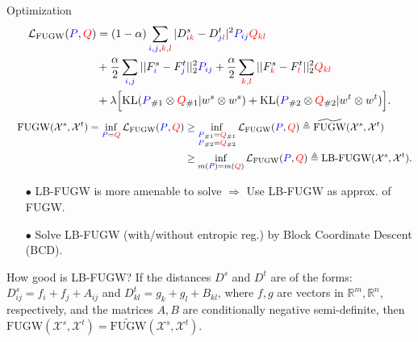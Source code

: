 \documentclass{beamer}
\newcommand{\fugw}{\text{FUGW}}
\newcommand{\kl}{\text{KL}}
\newcommand{\cX}{\mathcal X}
\newcommand{\cL}{\mathcal L}
\newcommand{\bbR}{\mathbb R}
\begin{document}
\begin{frame}{Optimization}
\scriptsize
\vspace{-1.3cm}
\begin{align*}
  \cL_{\fugw}({\color{blue}{P}}, {\color{red}{Q}}) &=
  (1 - \alpha) \sum_{{\color{blue}{i, j}},{\color{red}{k, l}}} |
  D^s_{{\color{blue}{i}}{\color{red}{k}}} - D^t_{{\color{blue}{j}}{\color{red}{l}}}|^2
  {\color{blue}{P_{ij}}} {\color{red}{Q_{kl}}} \\
  &+ \frac{\alpha}{2} \sum_{{\color{blue}{i, j}}} || F^s_{\color{blue}{i}} - F^t_{\color{blue}{j}}||_2^2 {\color{blue}{P_{ij}}}
  + \frac{\alpha}{2} \sum_{{\color{red}{k, l}}} || F^s_{{\color{red}{k}}} - F^t_{{\color{red}{l}}}||_2^2 {\color{red}{Q_{kl}}} \\
  &+ \lambda \Big[ \kl({\color{blue}{P}}_{\# 1} \otimes {\color{red}{Q}}_{\# 1} \vert w^s \otimes w^s)
  + \kl({\color{blue}{P}}_{\# 2} \otimes {\color{red}{Q}}_{\# 2} \vert w^t \otimes w^t) \Big].
\end{align*}
\vspace{-0.7cm}
\begin{align*}
  \quad \fugw(\cX^s, \cX^t) = \inf_{\substack{{\color{blue}{P}} = {\color{red}{Q}}}}
  \cL_{\fugw}({\color{blue}{P}}, {\color{red}{Q}}) &\geq \inf_{\substack{{\color{blue}{P}}_{\#1} = {\color{red}{Q}}_{\#1} \\ {\color{blue}{P}}_{\#2} = {\color{red}{Q}}_{\#2}}}
  \cL_{\fugw}({\color{blue}{P}}, {\color{red}{Q}}) \triangleq \widetilde{\fugw}(\cX^s, \cX^t) \\
  &\geq \inf_{\substack{m({\color{blue}{P}}) = m({\color{red}{Q}})}}
  \cL_{\fugw}({\color{blue}{P}}, {\color{red}{Q}}) \triangleq \text{LB-FUGW} (\cX^s, \cX^t).
\end{align*}
\vspace{-0.5cm}
\begin{itemize}
  \item[$\bullet$] LB-FUGW is more amenable to solve
  $\Rightarrow$ Use LB-FUGW as approx. of FUGW.
  \item[$\bullet$] Solve LB-FUGW (with/without entropic reg.)
  by Block Coordinate Descent (BCD).
\end{itemize}
\vspace{-0.2cm}
\begin{block}{How good is LB-FUGW?}
  If the distances $D^s$ and $D^t$ are of the forms: $D^s_{ij} = f_i + f_j + A_{ij}$ and
  $D^t_{kl} = g_k + g_l + B_{kl}$, where $f, g$ are vectors in $\bbR^m, \bbR^n$, respectively,
  and the matrices $A, B$ are conditionally negative semi-definite, then
  $\fugw (\cX^s, \cX^t) = \widetilde{\fugw}(\cX^s, \cX^t)$.
\end{block}


\end{frame}
\end{document}
